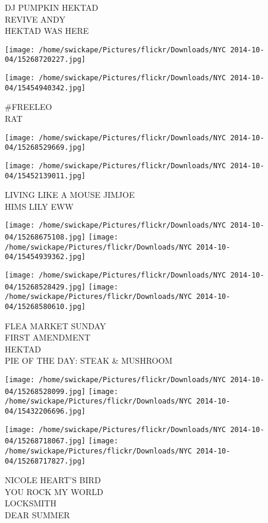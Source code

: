 \documentclass[10pt,letterpaper]{article}
\begin{document}
DJ PUMPKIN HEKTAD\\
REVIVE ANDY\\
HEKTAD WAS HERE
\pagebreak

\texttt{[image: /home/swickape/Pictures/flickr/Downloads/NYC 2014-10-04/15268720227.jpg]}

\vspace{0.25in}
\texttt{[image: /home/swickape/Pictures/flickr/Downloads/NYC 2014-10-04/15454940342.jpg]}

\#FREELEO\\
RAT
\pagebreak

\texttt{[image: /home/swickape/Pictures/flickr/Downloads/NYC 2014-10-04/15268529669.jpg]}

\vspace{0.25in}
\texttt{[image: /home/swickape/Pictures/flickr/Downloads/NYC 2014-10-04/15452139011.jpg]}

LIVING LIKE A MOUSE JIMJOE\\
HIMS LILY EWW
\pagebreak

\texttt{[image: /home/swickape/Pictures/flickr/Downloads/NYC 2014-10-04/15268675108.jpg]}
\texttt{[image: /home/swickape/Pictures/flickr/Downloads/NYC 2014-10-04/15454939362.jpg]}

\texttt{[image: /home/swickape/Pictures/flickr/Downloads/NYC 2014-10-04/15268528429.jpg]}
\texttt{[image: /home/swickape/Pictures/flickr/Downloads/NYC 2014-10-04/15268580610.jpg]}

FLEA MARKET SUNDAY\\
FIRST AMENDMENT\\
HEKTAD\\
PIE OF THE DAY: STEAK \& MUSHROOM
\pagebreak

\texttt{[image: /home/swickape/Pictures/flickr/Downloads/NYC 2014-10-04/15268528099.jpg]}
\texttt{[image: /home/swickape/Pictures/flickr/Downloads/NYC 2014-10-04/15432206696.jpg]}

\texttt{[image: /home/swickape/Pictures/flickr/Downloads/NYC 2014-10-04/15268718067.jpg]}
\texttt{[image: /home/swickape/Pictures/flickr/Downloads/NYC 2014-10-04/15268717827.jpg]}

NICOLE HEART'S BIRD\\
YOU ROCK MY WORLD\\
LOCKSMITH\\
DEAR SUMMER
\pagebreak
\end{document}

